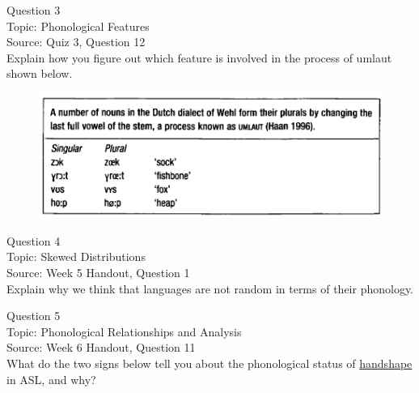 \documentclass[12pt]{article}
\begin{document}
\newpage

{\large Question 3}\\

Topic: Phonological Features\\
Source: Quiz 3, Question 12\\

Explain how you figure out which feature is involved in the process of umlaut shown below.\\

\begin{figure}[H]
\includegraphics{../images/dutch.png}
\end{figure}

\newpage

{\large Question 4}\\

Topic: Skewed Distributions\\
Source: Week 5 Handout, Question 1\\

Explain why we think that languages are not random in terms of their phonology.\\


\newpage

{\large Question 5}\\

Topic: Phonological Relationships and Analysis\\
Source: Week 6 Handout, Question 11\\

What do the two signs below tell you about the phonological status of \underline{handshape} in ASL, and why?\\
\end{document}
